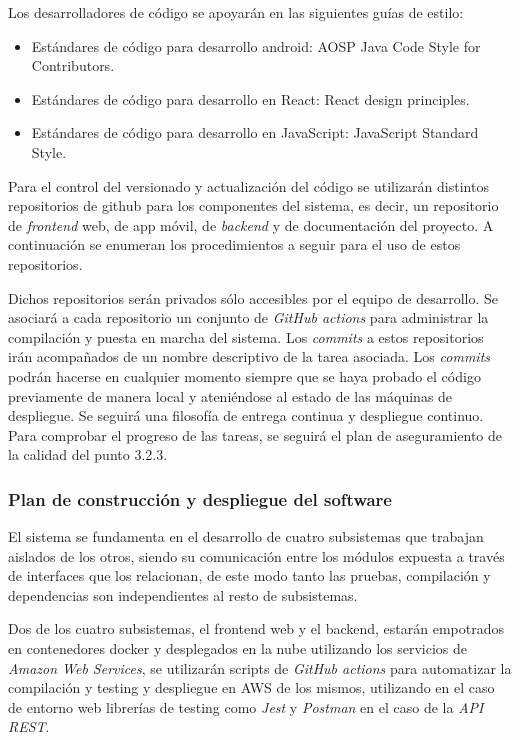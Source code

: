 \documentclass{article}
\begin{document}
Los desarrolladores de código se apoyarán en las siguientes guías de estilo:

\begin{itemize}
    \setlength{\itemsep}{0em}
    \item Estándares de código para desarrollo android: AOSP Java Code Style for Contributors.
    \item Estándares de código para desarrollo en React: React design principles.
    \item Estándares de código para desarrollo en JavaScript: JavaScript Standard Style.
\end{itemize}

Para el control del versionado y actualización del código se utilizarán distintos repositorios de github 
para los componentes del sistema, es decir, un repositorio de \textit{frontend} web, de app móvil, de \textit{backend} 
y de documentación del proyecto. A continuación se enumeran los procedimientos a seguir para el uso de estos repositorios.

Dichos repositorios serán privados sólo accesibles por el equipo de desarrollo.
Se asociará a cada repositorio un conjunto de \textit{GitHub actions} para administrar la compilación y 
puesta en marcha del sistema.
Los \textit{commits} a estos repositorios irán acompañados de un nombre descriptivo de la tarea asociada.
Los \textit{commits} podrán hacerse en cualquier momento siempre que se haya probado el código previamente 
de manera local y ateniéndose al estado de las máquinas de despliegue.
Se seguirá una filosofía de entrega continua y despliegue continuo.
Para comprobar el progreso de las tareas, se seguirá el plan de aseguramiento de la calidad del punto 3.2.3.

\subsubsection{Plan de construcción y despliegue del software}

El sistema se fundamenta en el desarrollo de cuatro subsistemas que trabajan aislados de los otros, 
siendo su comunicación entre los módulos expuesta a través de interfaces que los relacionan, de este modo 
tanto las pruebas, compilación y dependencias son independientes al resto de subsistemas. 

Dos de los cuatro subsistemas, el frontend web y el backend, estarán empotrados en contenedores docker y 
desplegados en la nube utilizando los servicios de \textit{Amazon Web Services}, se utilizarán scripts de 
\textit{GitHub actions} para automatizar la compilación y testing y despliegue en AWS de los mismos, 
utilizando en el caso de entorno web librerías de testing como \textit{Jest} y \textit{Postman} en el caso de la \textit{API REST}. 
\end{document}
